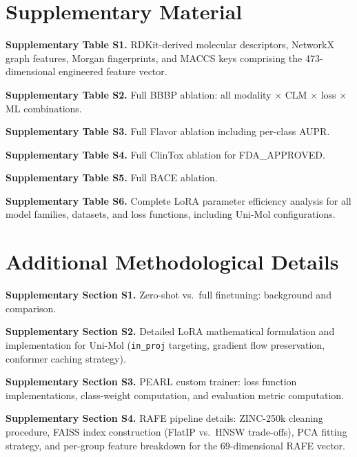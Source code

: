 \documentclass[pdflatex,sn-mathphys-num]{sn-jnl}%
\theoremstyle{thmstyleone}%
\theoremstyle{thmstyletwo}%
\theoremstyle{thmstylethree}%
\begin{document}
\begin{appendices}

\section{Supplementary Material}\label{sec:supplementary}

\noindent\textbf{Supplementary Table S1.} RDKit-derived molecular descriptors, NetworkX graph
features, Morgan fingerprints, and MACCS keys comprising the 473-dimensional engineered
feature vector.

\noindent\textbf{Supplementary Table S2.} Full BBBP ablation: all modality $\times$ CLM $\times$
loss $\times$ ML combinations.

\noindent\textbf{Supplementary Table S3.} Full Flavor ablation including per-class AUPR.

\noindent\textbf{Supplementary Table S4.} Full ClinTox ablation for FDA\_APPROVED.

\noindent\textbf{Supplementary Table S5.} Full BACE ablation.

\noindent\textbf{Supplementary Table S6.} Complete LoRA parameter efficiency analysis for all
model families, datasets, and loss functions, including Uni-Mol configurations.

\section{Additional Methodological Details}\label{sec:supp_methods}

\noindent\textbf{Supplementary Section S1.} Zero-shot vs.\ full finetuning: background and
comparison.

\noindent\textbf{Supplementary Section S2.} Detailed LoRA mathematical formulation and
implementation for Uni-Mol (\texttt{in\_proj} targeting, gradient flow preservation,
conformer caching strategy).

\noindent\textbf{Supplementary Section S3.} PEARL custom trainer: loss function
implementations, class-weight computation, and evaluation metric computation.

\noindent\textbf{Supplementary Section S4.} RAFE pipeline details: ZINC-250k cleaning
procedure, FAISS index construction (FlatIP vs.\ HNSW trade-offs), PCA fitting strategy,
and per-group feature breakdown for the 69-dimensional RAFE vector.

\end{appendices}


\end{document}
